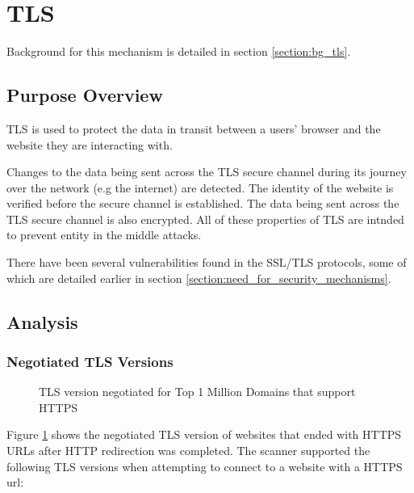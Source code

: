 \documentclass{mscreport}
\begin{document}
\newpage

\section{TLS}
\label{section:ana_ssl_tls}

Background for this mechanism is detailed in section \ref{section:bg_tls}.

\subsection{Purpose Overview}

\noindent
TLS is used to protect the data in transit between a users' browser and the website they are interacting with.

\vspace{0.3cm} \noindent
Changes to the data being sent across the TLS secure channel during its journey over the network (e.g the internet) are detected. The identity of the website is verified before the secure channel is established. The data being sent across the TLS secure channel is also encrypted. All of these properties of TLS are intnded to prevent entity in the middle attacks.

\vspace{0.3cm} \noindent There have been several vulnerabilities found in the SSL/TLS protocols, some of which are detailed earlier in section \ref{section:need_for_security_mechanisms}. 

\subsection{Analysis}

\subsubsection{Negotiated TLS Versions}

\begin{figure}[H]
	\begin{center}
		\caption{TLS version negotiated for Top 1 Million Domains that support HTTPS}
		\label{fig:tls_negotiated}
	\end{center}
\end{figure}

\noindent
Figure \ref{fig:tls_negotiated} shows the negotiated TLS version of websites that ended with HTTPS URLs after HTTP redirection was completed. The scanner supported the following TLS versions when attempting to connect to a website with a HTTPS url:
\end{document}
